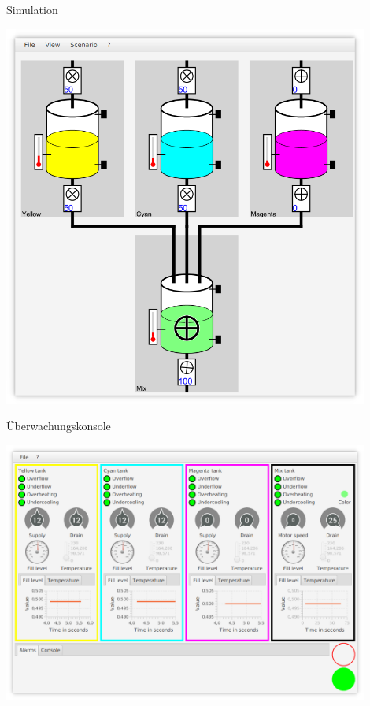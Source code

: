 \documentclass[22pt]{beamer}
\begin{document}
\begin{frame}{Simulation}
\vspace*{-1em}
 \begin{center}
 \includegraphics[height=0.9\textheight,width=0.9\textwidth,keepaspectratio=true]{ScreenshotSimulation.png}
 \end{center}
\end{frame}

\begin{frame}{Überwachungskonsole}
  \vspace*{-1em}
 \begin{center}
  \includegraphics[height=0.9\textheight,width=0.9\textwidth,keepaspectratio=true]{ScreenshotMonitor.png}
 \end{center}
\end{frame}
\end{document}
